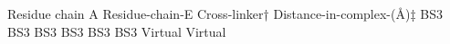\bTABLE
\bTR
\bTD Residue chain A  \eTD \bTD  Residue-chain-E  \eTD \bTD  Cross-linker†   \eTD \bTD  Distance-in-complex-(Å)‡ \eTD
\eTR
\bTR
{}     \eTD {}      \eTD \bTD BS3      \eTD {} \eTD
\eTR
\bTR
{}      \eTD {}      \eTD \bTD BS3      \eTD {} \eTD
\eTR
\bTR
{}      \eTD {}      \eTD \bTD BS3      \eTD {} \eTD
\eTR
\bTR
{}       \eTD {}      \eTD \bTD BS3      \eTD {} \eTD
\eTR
\bTR
{}      \eTD {}      \eTD \bTD BS3      \eTD {} \eTD
\eTR
\bTR
{}      \eTD {}      \eTD \bTD BS3      \eTD {} \eTD
\eTR
\bTR
{}      \eTD {}      \eTD \bTD Virtual  \eTD {} \eTD
\eTR
\bTR
{}     \eTD {}      \eTD \bTD Virtual  \eTD {} \eTD
\eTR
\eTABLE
